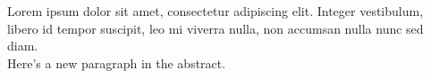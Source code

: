 Lorem ipsum dolor sit amet, consectetur adipiscing elit. Integer vestibulum, libero id tempor suscipit, leo mi viverra nulla, non accumsan nulla nunc sed diam. \\
Here's a new paragraph in the abstract.
